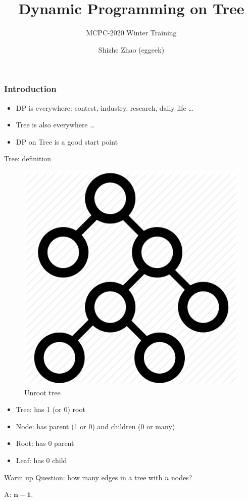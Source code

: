 \documentclass{beamer}
\title[Dynamic Programming on Tree]{
  Dynamic Programming on Tree
}
\subtitle {MCPC-2020 Winter Training}
\date{}
\author[Shizhe Zhao (eggeek)]{
  Shizhe Zhao (eggeek)
}
\begin{document}

\frame{\titlepage}

\begin{frame}
  \frametitle{Introduction}
\begin{itemize}
  \item DP is everywhere: contest, industry, research, daily life \ldots
  \item Tree is also everywhere \ldots
  \item DP on Tree is a good start point
\end{itemize}

\end{frame}
\begin{frame}{Tree: definition}
\begin{minipage}{.3\textwidth}
  \begin{figure}[h]
  \includegraphics[width=.9\textwidth]{pics/tree.png}
  \caption{Unroot tree}
  \end{figure} 
\end{minipage}%
\begin{minipage}{.7\textwidth}
\begin{itemize}
  \item Tree: has 1 (or 0) root
  \item Node: has parent (1 or 0) and children (0 or many)
  \item Root: has 0 parent
  \item Leaf: has 0 child
\end{itemize}
 {
\small 
Warm up Question: how many edges in a tree with $n$ nodes?
}

 {
  \small
  A: $\mathbf{n-1}$.
}
\end{minipage}
\end{frame}
\end{document}

